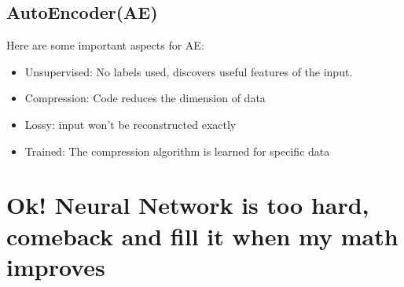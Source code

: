 \documentclass[letterpaper,12pt]{article}
\begin{document}
\subsection{AutoEncoder(AE)}
Here are some important aspects for AE:\begin{itemize}
    \item Unsupervised: No labels used, discovers useful features of the input. 
    \item Compression: Code reduces the dimension of data
    \item Lossy: input won't be reconstructed exactly
    \item Trained: The compression algorithm is learned for specific data
\end{itemize}

\section{Ok! Neural Network is too hard, comeback and fill it when my math improves}
\end{document}
